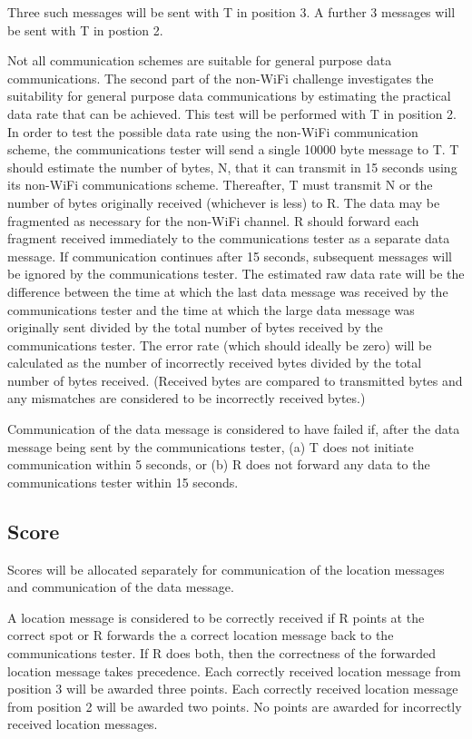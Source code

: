 \documentclass[12pt]{article}
\begin{document}
Three such messages will be sent with T in position 3. A further 3 messages will be sent with T in postion 2.

Not all communication schemes are suitable for general purpose data communications. The second part of the non-WiFi challenge investigates the suitability for general purpose data communications by estimating the practical data rate that can be achieved. This test will be performed with T in position 2.
In order to test the possible data rate using the non-WiFi communication scheme, the communications tester will send a single 10000 byte message to T. T should estimate the number of bytes, N, that it can transmit in 15 seconds using its non-WiFi communications scheme. Thereafter, T must transmit N or the number of bytes originally received (whichever is less) to R. The data may be fragmented as necessary for the non-WiFi channel. R should forward each fragment received immediately to the communications tester as a separate data message. If communication continues after 15 seconds, subsequent messages will be ignored by the communications tester. The estimated raw data rate will be the difference between the time at which the last data message was received by the communications tester and the time at which the large data message was originally sent divided by the total number of bytes received by the communications tester. The error rate (which should ideally be zero) will be calculated as the number of incorrectly received bytes divided by the total number of bytes received. (Received bytes are compared to transmitted bytes and any mismatches are considered to be incorrectly received bytes.)

Communication of the data message is considered to have failed if, after the data message being sent by the communications tester, (a) T does not initiate communication within 5 seconds, or (b) R does not forward any data to the communications tester within 15 seconds.

\subsection{Score}
Scores will be allocated separately for communication of the location messages and communication of the data message.

A location message is considered to be correctly received if R points at the correct spot or R forwards the a correct location message back to the communications tester. If R does both, then the correctness of the forwarded location message takes precedence.
Each correctly received location message from position 3 will be awarded three points. Each correctly received location message from position 2 will be awarded two points. No points are awarded for incorrectly received location messages.
\end{document}
